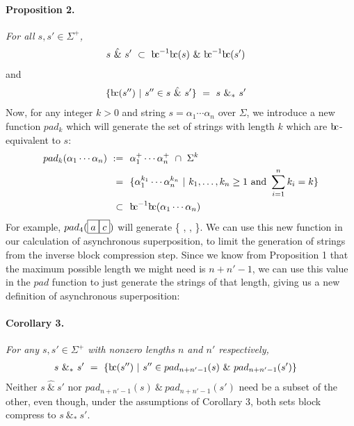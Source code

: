 \documentclass[a4paper,11pt,leqno]{article}
\newcommand{\bc}{{\rm b\!c}}
\newcommand{\vph}[1]{\vphantom{#1}}
\newcommand{\eboxl}[1]{\fbox{$\vph{'}#1$}}
\begin{document}
\paragraph{Proposition 2.} {\sl For all $s,s'\in \Sigma^+$,}
\begin{align}
s\ \hat{\&}\ s' & \ \subset\ \bc^{-1}\bc(s)\ \&\ \bc^{-1}\bc(s')
\end{align}
and
\begin{align}
\{\bc(s'')\ | \ s''\in s\ \hat{\&}\ s'\}
& \ = \   s\ \&_*\ s'
\end{align}
Now, for any integer $k > 0$ and string $s = \alpha_1\cdots\alpha_n$ over 
$\Sigma$, we introduce a new 
function 
$pad_k$ which will generate the set of strings with length $k$ which are 
$\bc$-equivalent to $s$:
\begin{subequations}
\begin{align}
pad_k(\alpha_1\cdots\alpha_n)~:=&~~\alpha_1^+\cdots\alpha_n^+\ \cap\ \Sigma^k \\
=&~~\{
\alpha_1^{k_1}\cdots\alpha_n^{k_n}\ | \
k_1,\ldots,k_n\geq 1
\mbox{ and } \sum_{i=1}^n k_i = k \}\\
\subset&~~\bc^{-1}\bc(\alpha_1\cdots\alpha_n)
\end{align}
\end{subequations}
For example, $pad_{4}(\eboxl{a}\eboxl{c})$ will 
generate \{
\eboxl{a}\eboxl{a}\eboxl{a}\eboxl{c}, 
\eboxl{a}\eboxl{a}\eboxl{c}\eboxl{c}, 
\eboxl{a}\eboxl{c}\eboxl{c}\eboxl{c} \}. We 
can use this new function in our 
calculation of asynchronous superposition, to limit the generation of strings 
from the inverse block compression step. Since we know from Proposition 1 that 
the maximum possible 
length we might need is $n+n'-1$, we can use this value in the $pad$ function 
to just 
generate the strings of that length, giving us a new definition of asynchronous 
superposition:
\paragraph{Corollary 3.} {\sl For any $s,s'\in \Sigma^+$
	with nonzero lengths $n$ and $n'$ respectively,}
\begin{align}
s \ \&_* \ s' & \ = \
\{\bc(s'')\ | \ s''\in pad_{n+n'-1}(s)\ \& \ pad_{n+n'-1}(s')\}
\end{align}
Neither $s\ \hat{\&}\ s'$ nor $pad_{n+n'-1}(s)\ \& \ pad_{n+n'-1}(s')$
need be a subset of the other, even though,
under the assumptions of Corollary 3, 
both sets block compress to $s \ \&_* \ s'$.
\end{document}
